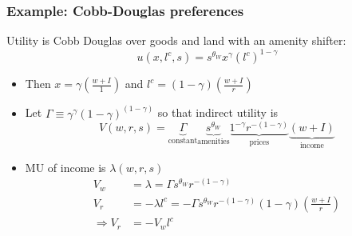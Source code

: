 \documentclass[11pt,notes=hide,aspectratio=169]{beamer}
\begin{document}
\begin{frame}
\frametitle{Example: Cobb-Douglas preferences}
Utility is Cobb Douglas over goods and land with an amenity shifter: 
$$u(x, l^c, s)=s^{\theta_W} x^{\gamma} (l^c)^{1-\gamma}$$
\vspace{-7mm}
\begin{itemize}
\item Then $x=\gamma \left(\frac{w + I}{1} \right)$ and $l^c=(1-\gamma)\left(\frac{w + I}{r}\right)$ \medskip
\item Let $\Gamma \equiv \gamma^\gamma (1-\gamma)^{(1-\gamma)}$ so that indirect utility is
\begin{equation*}
V(w, r, s)  = 
\underbrace{\Gamma}_{\text{constant}} 
\underbrace{s^{\theta_W}}_{\text{amenities}} 
\underbrace{1^{-\gamma} r^{-(1-\gamma)}}_{\text{prices}}
\underbrace{(w + I)}_{\text{income}}
\end{equation*}
\item MU of income is $\lambda(w, r, s)$ 
\begin{align*}
V_w &= \lambda = \Gamma s^{\theta_W} r^{-(1-\gamma)}  \\
V_r &= -\lambda l^c =  -\Gamma s^{\theta_W} r^{-(1-\gamma)} (1-\gamma)\left(\frac{w + I}{r}\right) \\
\Rightarrow  V_r &= - V_w l^c 
\end{align*}
\end{itemize}
\end{frame}
\end{document}
